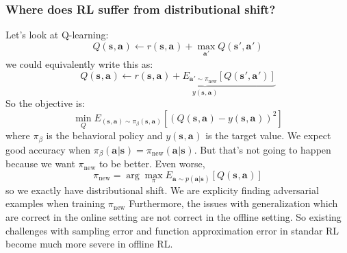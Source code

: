 \documentclass{report}
\newcommand{\argmax}{\arg\!\max}
\begin{document}
\subsubsection{Where does RL suffer from distributional shift?}
Let's look at Q-learning:
\begin{equation}
		Q (\bm{s}_{}, \bm{a}_{} ) \leftarrow
		r (\bm{s}_{}, \bm{a}_{} ) + \max_{\bm{a}_{}'} Q (\bm{s}_{}', \bm{a}_{}' )
\end{equation}
we could equivalently write this as:
\begin{equation}
		Q (\bm{s}_{}, \bm{a}_{} ) \leftarrow
		\underbrace{r (\bm{s}_{}, \bm{a}_{} ) + E_{\bm{a}_{}' \sim \pi_{\text{new}}} \left[    Q (\bm{s}_{}', \bm{a}_{}' )\right]}_{y (\bm{s}_{}, \bm{a}_{} )}
\end{equation}
So the objective is:
\begin{equation}
	\min_{Q} E_{(\bm{s}_{}, \bm{a}_{} )\sim \pi_{\beta}(\bm{s}_{}, \bm{a}_{} )}
	\left[ \left( Q (\bm{s}_{}, \bm{a}_{} ) - y (\bm{s}_{}, \bm{a}_{} ) \right)^{2}  \right] 
\end{equation}
where $ \pi_{\beta}  $ is the behavioral policy and
$ y (\bm{s}_{}, \bm{a}_{} ) $ is the target value.
We expect good accuracy when $ \pi_{\beta} (\bm{a}_{}|\bm{s}_{}) = \pi_{\text{new}} (\bm{a}_{}|\bm{s}_{})  $.
But that's not going to happen because we want $ \pi_{\text{new}}  $
to be better.
Even worse,
\begin{equation}
		\pi_{\text{new}} = \argmax_{\pi} E_{\bm{a}_{}\sim p(\bm{a}_{}|\bm{s}_{}) } \left[ Q (\bm{s}_{}, \bm{a}_{} ) \right] 
\end{equation}
so we exactly have distributional shift.
We are explicity finding adversarial examples when training $ \pi_{\text{new}}  $
Furthermore, the issues with generalization which are correct in the online
setting are not correct in the offline setting.
So existing challenges with sampling error and function approximation error in standar RL
become much more severe in offline RL.
\end{document}
